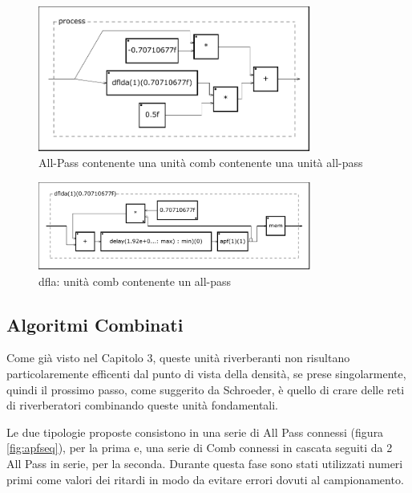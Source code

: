 

\begin{figure}[htp]
\centering
\includegraphics[width=0.80\textwidth]{Code/msapfdwp-svg/process.pdf}
\caption{All-Pass contenente una unità comb contenente una unità all-pass}
\label{fig:apfdwp}
\end{figure}

\begin{figure}[htp]
\centering
\includegraphics[width=0.80\textwidth]{Code/msapfdwp-svg/dflda-0x600001c847e0.pdf}
\caption{dfla: unità comb contenente un all-pass}
\label{fig:dfla}
\end{figure}

\subsection{Algoritmi Combinati}

Come già visto nel Capitolo 3, queste unità riverberanti non risultano particolaremente efficenti dal punto di vista della densità, se prese singolarmente, quindi il prossimo passo, come suggerito da Schroeder, è quello di crare delle reti di riverberatori combinando queste unità fondamentali.

\bigskip

Le due tipologie proposte consistono in una serie di All Pass connessi (figura \ref{fig:apfseq}), per la prima e, una serie di Comb connessi in cascata seguiti da 2 All Pass in serie, per la seconda.
Durante questa fase sono stati utilizzati numeri primi come valori dei ritardi in modo da evitare errori dovuti al campionamento.


